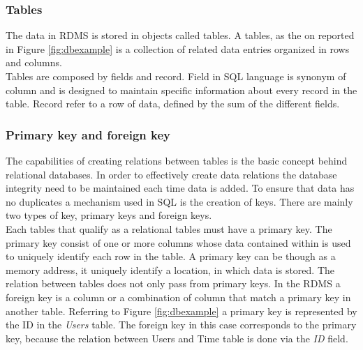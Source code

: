 \documentclass[../main.tex]{subfiles}
\begin{document}
\subsubsection{Tables}
The data in \gls{RDMS} is stored in objects called tables. A tables, as the on reported in Figure \ref{fig:dbexample} is a collection of related data entries organized in rows and columns.\\
Tables are composed by fields and record. Field in \gls{SQL} language is synonym of column and is designed to maintain specific information about every record in the table. Record refer to a row of data, defined by the sum of the different fields.
\subsubsection{Primary key and foreign key}
The capabilities of creating relations between tables is the basic concept behind relational databases. In order to effectively create data relations the database integrity need to be maintained each time data is added. To ensure that data has no duplicates a mechanism used in SQL is the creation of keys. There are mainly two types of key, primary keys and foreign keys.\\
Each tables that qualify as a relational tables must have a primary key. The primary key consist of one or more columns whose data contained within is used to uniquely identify each row in the table. A primary key can be though as a memory address, it uniquely identify a location, in which data is stored. The relation between tables does not only pass from primary keys. In the \gls{RDMS} a foreign key is a column or a combination of column that match a primary key in another table. Referring to Figure \ref{fig:dbexample} a primary key is represented by the ID in the \textit{Users} table. The foreign key in this case corresponds to the primary key, because the relation between Users and Time table is done via the \textit{ID} field.
\end{document}
